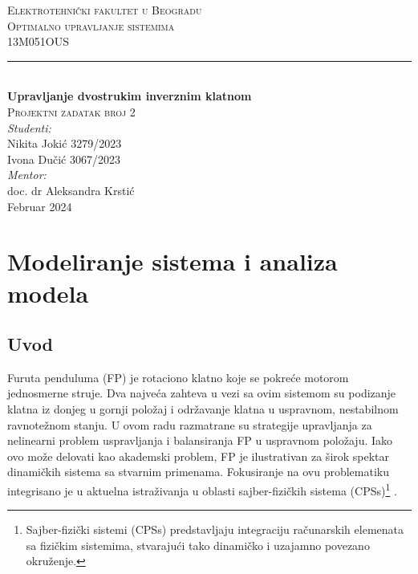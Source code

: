 \documentclass[a4paper,11pt]{article}
\theoremstyle{definition} \newtheorem{deff}{Definicija}[section]
\theoremstyle{definition} \newtheorem{prim}[deff]{Primer}
\theoremstyle{plain} \newtheorem{teor}[deff]{Teorema}
\begin{document}
	
	\begin{titlepage}
		
		\newcommand{\HRule}{\rule{\linewidth}{0.5mm}} 							%
		\center 
		
		\textsc{\LARGE Elektrotehnički fakultet u Beogradu}\\[1cm]
		
		\textsc{\Large Optimalno upravljanje sistemima}\\[0.2cm]
		\textsc{\large 13M051OUS}\\[1cm] 										
		\HRule \\[0.8cm]
		{ \huge \bfseries Upravljanje dvostrukim inverznim klatnom}\\[0.7cm]								%
		\textsc{\large Projektni zadatak broj 2}\\[1cm]
		
		
		\large
		\vfill 
		\emph{Studenti:}\\
		Nikita Jokić 3279/2023\\[0.1cm]
		Ivona Dučić 3067/2023\\[1.5cm]		
		\emph{Mentor:}\\
		doc. dr Aleksandra Krstić\\[0.1cm]									
		{\large Februar 2024}\\[2cm]
	\end{titlepage}
	\tableofcontents
	\newpage
	
	\section{Modeliranje sistema i analiza modela}
	\subsection{Uvod} 
	
	Furuta penduluma (FP) je rotaciono klatno koje se pokreće motorom jednosmerne struje. Dva najveća zahteva u vezi sa ovim sistemom su podizanje klatna iz donjeg u gornji položaj i održavanje klatna u uspravnom, nestabilnom ravnotežnom stanju. U ovom radu razmatrane su  strategije upravljanja za nelinearni problem uspravljanja i balansiranja FP u uspravnom  položaju. Iako ovo može delovati kao akademski problem, FP je ilustrativan za širok spektar dinamičkih sistema sa stvarnim primenama. Fokusiranje na ovu problematiku integrisano je u aktuelna istraživanja u oblasti sajber-fizičkih sistema (CPSs)\footnote{Sajber-fizički sistemi (CPSs) predstavljaju integraciju računarskih elemenata sa fizičkim sistemima, stvarajući tako dinamičko i uzajamno povezano okruženje.} \cite{inicijalna}. \\ 
	
\end{document}
